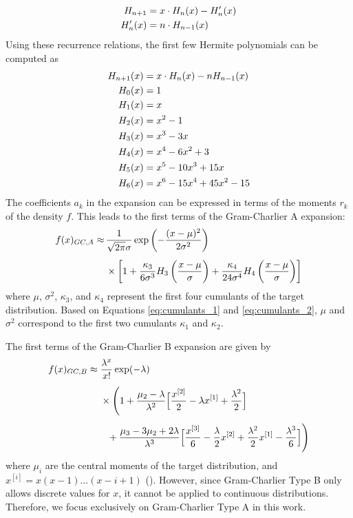 \begin{align}
    H_{n+1} &= x\cdot H_n(x) - H'_n(x) \notag \\
    H'_n(x) &= n\cdot H_{n-1}(x) \notag \\
\end{align}
Using these recurrence relations, the first few Hermite polynomials can be computed as
\begin{align}
    H_{n+1}(x) &= x\cdot H_n(x) - nH_{n-1}(x) \notag \\
    H_0(x) &= 1 \notag \\
    H_1(x) &= x \notag \\
    H_2(x) &= x^2 - 1 \notag \\
    H_3(x) &= x^3-3x \notag \\
    H_4(x) &= x^4-6x^2+3 \notag \\
    H_5(x) &= x^5-10x^3+15x \notag \\
    H_6(x) &= x^6-15x^4+45x^2-15 \notag
\end{align}
The coefficients $a_k$ in the expansion can be expressed in terms of the moments $r_k$ of the density $f$. This leads to the first terms of the Gram-Charlier A expansion:
\begin{align}
    \label{eq:gc_a_expansion_kappa}
    f(x)_{GC,A} \approx &\, \frac{1}{\sqrt{2\pi}\sigma}\exp\left(-\frac{(x-\mu)^2}{2\sigma^2}\right) \notag\\[1ex]
    &\, \times \left[1 + \frac{\kappa_3}{6\sigma^3}H_3\left(\frac{x-\mu}{\sigma}\right)
    + \frac{\kappa_4}{24\sigma^4}H_4\left(\frac{x-\mu}{\sigma}\right)\right]
\end{align}
where $\mu$, $\sigma^2$, $\kappa_3$, and $\kappa_4$ represent the first four cumulants of the target distribution. Based on Equations \eqref{eq:cumulants_1} and \eqref{eq:cumulants_2}, $\mu$ and $\sigma^2$ correspond to the first two cumulants $\kappa_1$ and $\kappa_2$.

The first terms of the Gram-Charlier B expansion are given by
\begin{align}
    f(x)_{GC,B} \approx &\; \frac{\lambda^x}{x!}\exp(-\lambda) \notag\\[1ex]
    &\; \times \Biggl( 1 
       + \frac{\mu_2 - \lambda}{\lambda^2}\Bigl[\frac{x^{[2]}}{2} - \lambda x^{[1]} + \frac{\lambda^2}{2}\Bigr] \notag\\[1ex]
    &\quad + \frac{\mu_3 - 3\mu_2 + 2\lambda}{\lambda^3}\Bigl[\frac{x^{[3]}}{6} - \frac{\lambda}{2}x^{[2]} + \frac{\lambda^2}{2}x^{[1]} - \frac{\lambda^3}{6}\Bigr] \Biggr) \notag
\end{align}    
where $\mu_i$ are the central moments of the target distribution, and $x^{[i]} = x(x-1)\dots (x-i+1)$ (\cite{mitropolskiiGramCharlierSeries2020}). However, since Gram-Charlier Type B only allows discrete values for $x$, it cannot be applied to continuous distributions. Therefore, we focus exclusively on Gram-Charlier Type A in this work.

